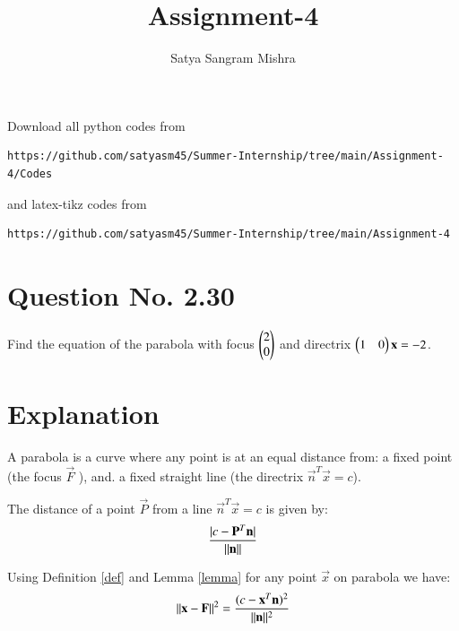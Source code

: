 \documentclass[journal,12pt,twocolumn]{IEEEtran}
\begin{document}
     \def\centbox#1{\makebox[0in]{#1}}
     \def\topbox#1{\raisebox{-\baselineskip}[0in][0in]{#1}}
     \def\midbox#1{\raisebox{-0.5\baselineskip}[0in][0in]{#1}}
\vspace{3cm}
\title{Assignment-4}
\author{Satya Sangram Mishra}
\maketitle
\newpage
\bigskip
\renewcommand{\thefigure}{\theenumi}
\renewcommand{\thetable}{\theenumi}
Download all python codes from 
\begin{lstlisting}
https://github.com/satyasm45/Summer-Internship/tree/main/Assignment-4/Codes
\end{lstlisting}
%
and latex-tikz codes from 
%
\begin{lstlisting}
https://github.com/satyasm45/Summer-Internship/tree/main/Assignment-4
\end{lstlisting}
%
\section{Question No. 2.30}
Find the equation of the parabola with focus $\begin{pmatrix}2\\0\end{pmatrix}$ and directrix $\begin{pmatrix}1&0\end{pmatrix}\mathbf{x}=-2$.
%
\section{Explanation}
\begin{definition}
\label{def}
A parabola is a curve where any point is at an equal distance from: a fixed point (the focus $\vec{F}$ ), and. a fixed straight line (the directrix $\vec{n}^T\vec{x}=c$).
\end{definition}
\begin{lemma}
\label{lemma}
The distance of a point $\vec{P}$ from a line $\vec{n}^T\vec{x}=c$ is given by:
\begin{align}
\frac{\vert c-\mathbf{P}^T\mathbf{n}\vert}{\Vert\mathbf{n}\rVert}   
\end{align}
\end{lemma}

Using Definition \ref{def} and Lemma \ref{lemma} for any point $\vec{x}$ on parabola we have:
\begin{align}
\Vert\mathbf{x}-\mathbf{F}\rVert^2=\frac{({c-\mathbf{x}^T\mathbf{n}})^2}{\Vert\mathbf{n}\rVert^2}\label{eq:1} 
\end{align}
\end{document}
